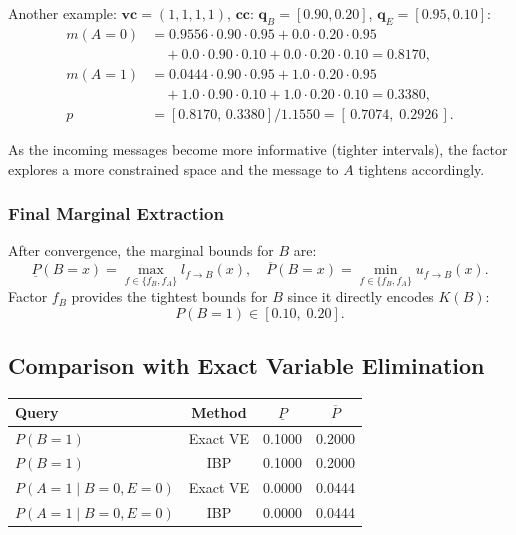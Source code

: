 \documentclass{article}
\begin{document}
Another example: $\mathbf{vc} = (1,1,1,1)$, $\mathbf{cc}$: $\mathbf{q}_B = [0.90, 0.20]$,
$\mathbf{q}_E = [0.95, 0.10]$:
\begin{align*}
  m(A{=}0) &= 0.9556 \cdot 0.90 \cdot 0.95 + 0.0 \cdot 0.20 \cdot 0.95 \\
            &\quad + 0.0 \cdot 0.90 \cdot 0.10 + 0.0 \cdot 0.20 \cdot 0.10 = 0.8170, \\
  m(A{=}1) &= 0.0444 \cdot 0.90 \cdot 0.95 + 1.0 \cdot 0.20 \cdot 0.95 \\
            &\quad + 1.0 \cdot 0.90 \cdot 0.10 + 1.0 \cdot 0.20 \cdot 0.10 = 0.3380, \\
  p &= [0.8170,\, 0.3380] / 1.1550 = [\,0.7074,\; 0.2926\,].
\end{align*}

As the incoming messages become more informative (tighter intervals), the factor
explores a more constrained space and the message to $A$ tightens accordingly.

\subsubsection{Final Marginal Extraction}

After convergence, the marginal bounds for $B$ are:
\[
  \underline{P}(B{=}x) = \max_{f \in \{f_B, f_A\}} l_{f \to B}(x), \quad
  \overline{P}(B{=}x) = \min_{f \in \{f_B, f_A\}} u_{f \to B}(x).
\]
Factor $f_B$ provides the tightest bounds for $B$ since it directly encodes $K(B)$:
\[
  P(B{=}1) \in [0.10,\; 0.20].
\]

\subsection{Comparison with Exact Variable Elimination}

\begin{center}
\begin{tabular}{lccc}
\toprule
\textbf{Query} & \textbf{Method} & $\underline{P}$ & $\overline{P}$ \\
\midrule
$P(B{=}1)$ & Exact VE & 0.1000 & 0.2000 \\
$P(B{=}1)$ & IBP & 0.1000 & 0.2000 \\
\midrule
$P(A{=}1 \mid B{=}0, E{=}0)$ & Exact VE & 0.0000 & 0.0444 \\
$P(A{=}1 \mid B{=}0, E{=}0)$ & IBP & 0.0000 & 0.0444 \\
\bottomrule
\end{tabular}
\end{center}
\end{document}
